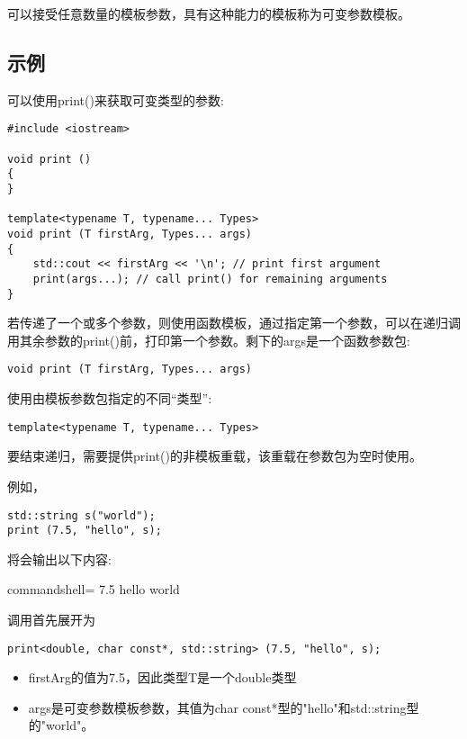 

可以接受任意数量的模板参数，具有这种能力的模板称为可变参数模板。

\subsection{示例}

可以使用print()来获取可变类型的参数:

\begin{lstlisting}[style=styleCXX]
#include <iostream>

void print ()
{
}

template<typename T, typename... Types>
void print (T firstArg, Types... args)
{
	std::cout << firstArg << '\n'; // print first argument
	print(args...); // call print() for remaining arguments
}
\end{lstlisting}

若传递了一个或多个参数，则使用函数模板，通过指定第一个参数，可以在递归调用其余参数的print()前，打印第一个参数。剩下的args是一个函数参数包:

\begin{lstlisting}[style=styleCXX]
void print (T firstArg, Types... args)
\end{lstlisting}

使用由模板参数包指定的不同“类型”:

\begin{lstlisting}[style=styleCXX]
template<typename T, typename... Types>
\end{lstlisting}

要结束递归，需要提供print()的非模板重载，该重载在参数包为空时使用。

例如，

\begin{lstlisting}[style=styleCXX]
std::string s("world");
print (7.5, "hello", s);
\end{lstlisting}

将会输出以下内容:

\begin{tcblisting}{commandshell={}}
7.5
hello
world
\end{tcblisting}

调用首先展开为

\begin{lstlisting}[style=styleCXX]
print<double, char const*, std::string> (7.5, "hello", s);
\end{lstlisting}

\begin{itemize}
\item 
firstArg的值为7.5，因此类型T是一个double类型

\item 
args是可变参数模板参数，其值为char const*型的"hello"和std::string型的"world"。
\end{itemize}

